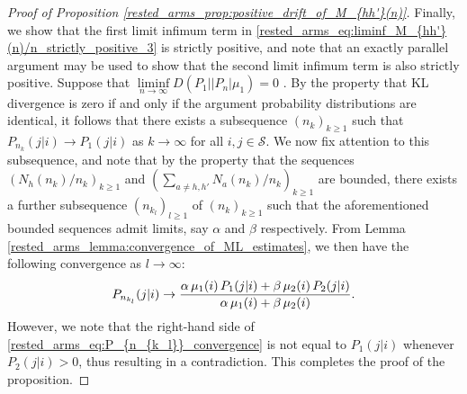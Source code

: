 \begin{proof}[Proof of Proposition \ref{rested_arms_prop:positive_drift_of_M_{hh'}(n)}]
Finally, we show that the first limit infimum term in \eqref{rested_arms_eq:liminf_M_{hh'}(n)/n_strictly_positive_3} is strictly positive, and note that an exactly parallel argument may be used to show that the second limit infimum term is also strictly positive. Suppose that $\liminf\limits_{n\to\infty}D(P_1||P_n|\mu_1)=0$ . By the property that KL divergence is zero if and only if the argument probability distributions are identical, it follows that there exists a subsequence $(n_k)_{k\geq 1}$ such that $P_{n_k}(j|i)\to P_1(j|i)$ as $k\to\infty$  for all $i,j\in\mathcal{S}$. We now fix attention to this subsequence, and note that by the property that the sequences $(N_h(n_k)/n_k)_{k\geq 1}$ and $(\sum\limits_{a\neq h,h'}N_a(n_k)/n_k)_{k\geq 1}$ are bounded, there exists a further subsequence $(n_{k_l})_{l\geq 1}$ of $(n_k)_{k\geq 1}$ such that the aforementioned bounded sequences admit limits, say $\alpha$ and $\beta$ respectively. From Lemma \ref{rested_arms_lemma:convergence_of_ML_estimates}, we then have the following convergence  as $l\to\infty$:
\begingroup\allowdisplaybreaks\begin{align}
	P_{n_{k_l}}(j|i)\to \frac{\alpha\,\mu_1(i)\,P_1(j|i)+\beta \,\mu_2(i)\,P_2(j|i)}{\alpha\,\mu_1(i)+\beta\,\mu_2(i)}.\label{rested_arms_eq:P_{n_{k_l}}_convergence}
\end{align}\endgroup
However, we note that the right-hand side of \eqref{rested_arms_eq:P_{n_{k_l}}_convergence} is not equal to $P_1(j|i)$ whenever $P_2(j|i)>0$, thus resulting in a contradiction. This completes the proof of the proposition.

\end{proof}
